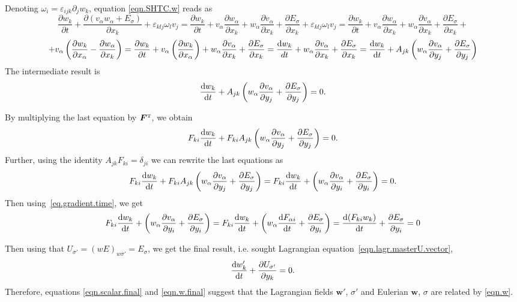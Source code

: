 \documentclass[twoside]{article}
\newcommand{\ww}{{\boldsymbol{w}}}
\newcommand{\FF}{{\boldsymbol{F}}}
\newcommand{\ted}{E} %
\newcommand{\pd}{\partial}
\newcommand{\transpose}{{\rm {\mathsmaller T}}}
\begin{document}
Denoting $ \omega_i = \varepsilon_{ijk}\pd_j w_k $, equation \eqref{eqn.SHTC.w} 
reads as
\[\frac{\pd  w_k}{\pd t}+\frac{\pd  \left(v_{\alpha }w_{\alpha 
}+\ted_\sigma\right)}{\pd x_k}+\varepsilon _{k l j}\omega_l v_j=\frac{\pd
 w_k}{\pd t}+v_{\alpha }\frac{\pd  w_{\alpha }}{\pd 
 x_k}+w_{\alpha }\frac{\pd  v_{\alpha }}{\pd x_k}+\frac{\pd  
 \ted_\sigma}{\pd
x_k}+\varepsilon _{k l j}\omega_l v_j=\frac{\pd  w_k}{\pd t}+v_{\alpha 
}\frac{\pd  w_{\alpha }}{\pd x_k}+w_{\alpha }\frac{\pd
 v_{\alpha }}{\pd x_k}+\frac{\pd  \ted_\sigma}{\pd x_k}+\] 
 \[+v_{\alpha 
 }\left(\frac{\pd w_k}{\pd x_{\alpha }}-\frac{\pd w_{\alpha
}}{\pd x_k}\right)=\frac{\pd  w_k}{\pd t}+v_{\alpha 
}\left(\frac{\pd  w_k}{\pd x_{\alpha }}\right)+w_{\alpha 
}\frac{\pd
 v_{\alpha }}{\pd x_k}+\frac{\pd  \ted_\sigma}{\pd x_k}=\frac{{\rm d}w_k}{d 
 t}+w_{\alpha }\frac{\pd  v_{\alpha }}{\pd x_k}+\frac{\pd
\ted_\sigma}{\pd x_k}=\frac{{\rm d}w_k}{{\rm d} t}+A_{j k}\left(w_{\alpha 
}\frac{\pd  
v_{\alpha }}{\pd y_j}+\frac{\pd  \ted_\sigma}{\pd y_j}\right)\] 
The intermediate result is
\[
\frac{{\rm d}w_k}{{\rm d} t}+A_{j k}\left(w_{\alpha }\frac{\pd v_{\alpha }}{\pd 
y_j}+\frac{\pd \ted_\sigma}{\pd y_j}\right)=0.\]

By multiplying the last equation  by $ \FF^\transpose $, we obtain
\[
F_{k i}\frac{{\rm d}w_k}{{\rm d} t}+F_{k i}A_{j k}\left(w_{\alpha }\frac{\pd 
v_{\alpha }}{\pd y_j}+\frac{\pd \ted_\sigma}{\pd y_j}\right)=0.\]
Further, using the identity $A_{j k} F_{k i}=\delta_{ji}$ we can rewrite the 
last 
equations
as 
\[F_{k i}\frac{{\rm d}w_k}{{\rm d} t}+F_{k i}A_{j k}\left(w_{\alpha }\frac{\pd 
v_{\alpha }}{\pd y_j}+\frac{\pd \ted_\sigma}{\pd y_j}\right)=F_{k
i}\frac{{\rm d}w_k}{{\rm d} t}+\left(w_{\alpha }\frac{\pd v_{\alpha }}{\pd 
y_i}+\frac{\pd \ted_\sigma}{\pd y_i}\right)=0.\] 
Then using~\eqref{eq.gradient.time}, we get
\[F_{k i}\frac{{\rm d}
w_k}{{\rm d} t}+\left(w_{\alpha }\frac{\pd v_{\alpha }}{\pd 
y_i}+\frac{\pd
\ted_\sigma}{\pd y_i}\right)=F_{k i}\frac{{\rm d}w_k}{{\rm d} 
t}+\left(w_{\alpha 
}\frac{{\rm d}
F_{\alpha  i}}{{\rm d} t}+\frac{\pd \ted_\sigma}{\pd y_i}\right)=\frac{{\rm d}
(F_{k i} w_k)}{{\rm d} t}+\frac{\pd \ted_\sigma}{\pd y_i}=0\]

Then using that $ U_{\sigma'} = (w \ted)_{w \sigma'} =\ted_\sigma  $, we get 
the 
final 
result, i.e. sought Lagrangian equation~\eqref{eqn.lagr.masterU.vector},
\begin{equation}\label{eqn.w.final}
\frac{{\rm d} w_k'}{{\rm d} t}+\frac{\pd U_{\sigma'}}{\pd y_k}=0.
\end{equation}
Therefore, equations \eqref{eqn.scalar.final} and \eqref{eqn.w.final} suggest 
that the Lagrangian fields $ \ww' $, $ \sigma' $ and Eulerian $ \ww $, $ \sigma 
$ are 
related by 
\eqref{eqn.w}.
\end{document}
